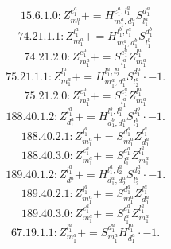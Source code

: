 \documentclass[letterpaper,10pt,fleqn,leqno,onecolumn]{article}
\begin{document}
\begin{equation} \;\;\;\;\;\;  15.6.1.0: Z^{e_{1}^{a}}_{m_{1}^{a}}+=H^{e_{1}^{a},l_{1}^{a}}_{m_{1}^{a},d_{1}^{a}}S^{d_{1}^{a}}_{l_{1}^{a}} \end{equation}
\begin{equation} \;\;\;\;\;\;  74.21.1.1: Z^{l_{1}^{a}}_{m_{1}^{a}}+=H^{l_{1}^{b},l_{1}^{a}}_{m_{1}^{a},d_{1}^{b}}S^{d_{1}^{b}}_{l_{1}^{b}} \end{equation}
\begin{equation} \;\;\;\;\;\;  74.21.2.0: Z^{e_{1}^{a}}_{m_{1}^{a}}+=S^{e_{1}^{a}}_{l_{1}^{a}}Z^{l_{1}^{a}}_{m_{1}^{a}} \end{equation}
\begin{equation} \;\;\;\;\;\;  75.21.1.1: Z^{l_{1}^{a}}_{m_{1}^{a}}+=H^{l_{1}^{a},l_{2}^{a}}_{m_{1}^{a},d_{1}^{a}}S^{d_{1}^{a}}_{l_{2}^{a}}\cdot -1. \end{equation}
\begin{equation} \;\;\;\;\;\;  75.21.2.0: Z^{e_{1}^{a}}_{m_{1}^{a}}+=S^{e_{1}^{a}}_{l_{1}^{a}}Z^{l_{1}^{a}}_{m_{1}^{a}} \end{equation}
\begin{equation} \;\;\;\;\;\;  188.40.1.2: Z^{l_{1}^{a}}_{d_{1}^{a}}+=H^{l_{1}^{b},l_{1}^{a}}_{d_{1}^{b},d_{1}^{a}}S^{d_{1}^{b}}_{l_{1}^{b}}\cdot -1. \end{equation}
\begin{equation} \;\;\;\;\;\;  188.40.2.1: Z^{l_{1}^{a}}_{m_{1}^{a}}+=S^{d_{1}^{a}}_{m_{1}^{a}}Z^{l_{1}^{a}}_{d_{1}^{a}} \end{equation}
\begin{equation} \;\;\;\;\;\;  188.40.3.0: Z^{e_{1}^{a}}_{m_{1}^{a}}+=S^{e_{1}^{a}}_{l_{1}^{a}}Z^{l_{1}^{a}}_{m_{1}^{a}} \end{equation}
\begin{equation} \;\;\;\;\;\;  189.40.1.2: Z^{l_{1}^{a}}_{d_{1}^{a}}+=H^{l_{1}^{a},l_{2}^{a}}_{d_{1}^{a},d_{2}^{a}}S^{d_{2}^{a}}_{l_{2}^{a}}\cdot -1. \end{equation}
\begin{equation} \;\;\;\;\;\;  189.40.2.1: Z^{l_{1}^{a}}_{m_{1}^{a}}+=S^{d_{1}^{a}}_{m_{1}^{a}}Z^{l_{1}^{a}}_{d_{1}^{a}} \end{equation}
\begin{equation} \;\;\;\;\;\;  189.40.3.0: Z^{e_{1}^{a}}_{m_{1}^{a}}+=S^{e_{1}^{a}}_{l_{1}^{a}}Z^{l_{1}^{a}}_{m_{1}^{a}} \end{equation}
\begin{equation} \;\;\;\;\;\;  67.19.1.1: Z^{l_{1}^{a}}_{m_{1}^{a}}+=S^{d_{1}^{a}}_{m_{1}^{a}}H^{l_{1}^{a}}_{d_{1}^{a}}\cdot -1. \end{equation}
\end{document}
